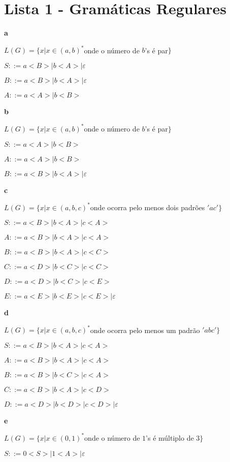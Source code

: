 \documentclass[ ]{article}
\begin{document}
	\section*{Lista 1 - Gramáticas Regulares}
	
	\textbf{a}
	
	$L(G) = \{x | x \in (a,b)^*$onde o número de $b$'s é par$\}$
	
	$S::= a<B> | b<A> | \varepsilon$
	
	$B::= a<B> | b<A> | \varepsilon$ %
	
	$A::= a<A> | b <B> $ %
	
	\textbf{b}
	
	$L(G) = \{x | x \in (a,b)^*$onde o número de $b$'s é par$\}$
	
	$S::= a<A> | b<B> $ %
	
	$A::= a<A> | b<B>$ %
	
	$B::= a<B>| b<A> | \varepsilon$ %
	
	\textbf{c}
	
	$L(G) = \{ x|x \in (a,b,c)^*$onde ocorra pelo menos dois padrões $'ac'\}$
	
	$S::= a<B> | b<A> | c<A>$
	
	$A::= a<B> | b<A> | c<A>$ %
	
	$B::= a<B> | b<A> | c<C>$ %
	
	$C::= a<D> | b<C> | c<C>$ %
	
	$D::= a<D> | b<C> | c<E>$ %
	
	$E::= a<E> | b<E> | c<E> | \varepsilon$
	
	\textbf{d}
	
	$L(G) = \{ x|x \in (a,b,c)^*$onde ocorra pelo menos um padrão $'abc'\}$
	
	$S::= a<B> | b<A> | c<A>$ 

	$A::= a<B> | b<A> | c<A>$ %
	
	$B::= a<B> | b<C> | c<A>$ %
	
	$C::= a<B> | b<A> | c<D>$ %
	
	$D::= a<D> | b<D> | c<D> | \varepsilon$ %
	
	\textbf{e}
	
	$L(G) = \{ x|x \in (0,1)^*$onde o número de $1$'s é múltiplo de $3\}$
	
	$S::= 0<S> | 1<A> | \varepsilon$%
	
\end{document}
